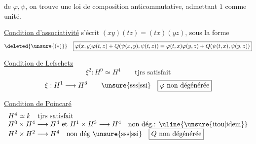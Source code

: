  de $\varphi,\psi$, on trouve une loi de composition
anticommutative, admettant $1$ comme unité.

\uline{Condition d'associativité} s'écrit $(xy)(tz)=(tx)(yz)$, sous la forme
\[
\deleted{\unsure{(*)}}\quad
\boxed{\varphi(x,y)\varphi(t,z)+Q(\psi(x,y),\psi(t,z))
=\varphi(t,x)\varphi(y,z)+Q(\psi(t,x),\psi(y,z))}
\]

\uline{Condition de Lefschetz}
\[
\xi^2:H^0\simeq H^4\qquad\text{tjrs satisfait}
\]
\[
\xi:H^1\longrightarrow H^3\qquad\text{\unsure{sss|ssi}}\quad
\boxed{\varphi\text{ non dégénérée}}
\]

\uline{Condition de Poincaré}
\[
\begin{array}{l}
H^4\simeq k\quad\text{tjrs satisfait}\\
H^0\times H^4\longrightarrow H^4\text{ et }H^1\times H^3\longrightarrow H^4\quad\text{non dég.: }\uline{\text{\unsure{itou|idem}}}\\
H^2\times H^2\longrightarrow H^4\quad\text{non dég \unsure{sss|ssi}}\quad\boxed{Q\text{ non dégénérée}}
\end{array}
\]
